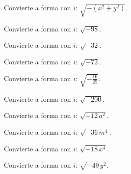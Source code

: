 \begin{ejercicio}
Convierte a forma con $i$: $\displaystyle \sqrt{-(x^{2}+y^{2})}$.
\end{ejercicio}

\begin{ejercicio}
Convierte a forma con $i$: $\displaystyle \sqrt{-98}$.
\end{ejercicio}

\begin{ejercicio}
Convierte a forma con $i$: $\displaystyle \sqrt{-32}$.
\end{ejercicio}

\begin{ejercicio}
Convierte a forma con $i$: $\displaystyle \sqrt{-72}$.
\end{ejercicio}

\begin{ejercicio}
Convierte a forma con $i$: $\displaystyle \sqrt{-\tfrac{16}{25}}$.
\end{ejercicio}

\begin{ejercicio}
Convierte a forma con $i$: $\displaystyle \sqrt{-200}$.
\end{ejercicio}

\begin{ejercicio}
Convierte a forma con $i$: $\displaystyle \sqrt{-12\,a^{2}}$.
\end{ejercicio}

\begin{ejercicio}
Convierte a forma con $i$: $\displaystyle \sqrt{-36\,m^{4}}$.
\end{ejercicio}

\begin{ejercicio}
Convierte a forma con $i$: $\displaystyle \sqrt{-18\,x^{4}}$.
\end{ejercicio}

\begin{ejercicio}
Convierte a forma con $i$: $\displaystyle \sqrt{-49\,y^{2}}$.
\end{ejercicio}

